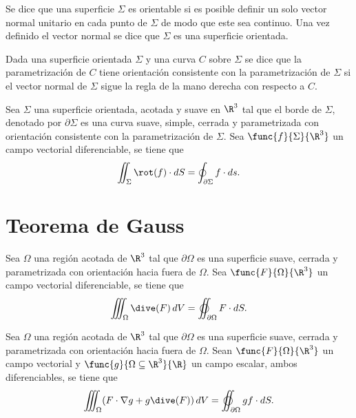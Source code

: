\documentclass[a4,11pt]{aleph-notas}
\begin{document}

\begin{defi}
    Se dice que una superficie $\Sigma$ es orientable si es posible definir un solo vector normal unitario en cada punto de $\Sigma$ de modo que este sea continuo. Una vez definido el vector normal se dice que $\Sigma$ es una superficie orientada.
\end{defi}

\begin{defi}
    Dada una superficie orientada $\Sigma$ y una curva $C$ sobre $\Sigma$ se dice que la parametrización de $C$ tiene orientación consistente con la parametrización de $\Sigma$ si el vector normal de $\Sigma$ sigue la regla de la mano derecha con respecto a $C$.
\end{defi}

\begin{teo}
    Sea $\Sigma$ una superficie orientada, acotada y suave en $\R^3$ tal que el borde de $\Sigma$, denotado por $\partial \Sigma$ es una curva suave, simple, cerrada y parametrizada con orientación consistente con la parametrización de $\Sigma$. Sea $\func{f}{\Sigma}{\R^3}$ un campo vectorial diferenciable, se tiene que
    \[
        \iint_\Sigma \rot(f) \cdot dS = \oint_{\partial \Sigma} f\cdot ds.
    \]
\end{teo}


\section{Teorema de Gauss}


\begin{teo}
    Sea $\Omega$ una región acotada de $\R^3$ tal que $\partial \Omega$ es una superficie suave, cerrada y parametrizada con orientación hacia fuera de $\Omega$. Sea $\func{F}{\Omega}{\R^3}$ un campo vectorial diferenciable, se tiene que
    \[
        \iiint_\Omega \dive(F) \, dV = \varoiint_{\partial \Omega} F\cdot dS.
    \]
\end{teo}

\begin{prop}
    Sea $\Omega$ una región acotada de $\R^3$ tal que $\partial \Omega$ es una superficie suave, cerrada y parametrizada con orientación hacia fuera de $\Omega$. Sean $\func{F}{\Omega}{\R^3}$ un campo vectorial y $\func{g}{\Omega\subseteq \R^3}{\R}$ un campo escalar, ambos diferenciables, se tiene que
    \[
        \iiint_{\Omega} (F \cdot \nabla g + g \dive(F))\, dV
        = \varoiint_{\partial \Omega}  g f \cdot dS.
    \]
\end{prop}
\end{document}
